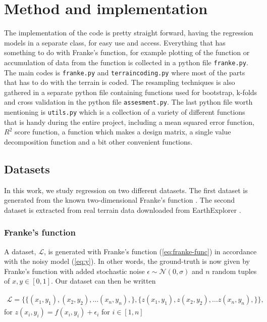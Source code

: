 \documentclass[../main.tex]{subfiles}
\begin{document}
\section{Method and implementation}\label{sec:method}
The implementation of the code is pretty straight forward, having the regression models in a separate class, for easy use and access. Everything that has something to do with Franke's function, for example plotting of the function or accumulation of data from the function is collected in a python file \verb|franke.py|. The main codes is \verb|franke.py| and \verb|terraincoding.py| where most of the parts that has to do with the terrain is coded. The resampling techniques is also gathered in a separate python file containing functions used for bootstrap, k-folds and cross validation in the python file \verb|assesment.py|. The last python file worth mentioning is \verb|utils.py| which is a collection of a variety of different functions that is handy during the entire project, including a mean squared error function, $R^2$ score function, a function which makes a design matrix, a single value decomposition function and a bit other convenient functions.

\subsection{Datasets}
In this work, we study regression on two different datasets. The first dataset is generated from the known two-dimensional Franke's function \cite{FrankeRichard1979}. The second dataset is extracted from real terrain data downloaded from EarthExplorer \cite{EarthExplorer}. 

\subsubsection{Franke's function}
A dataset, \ensuremath{\mathcal{L}}, is generated with Franke's function (\cref{eq:franke-func}) in accordance with the noisy model (\cref{eq:y}). In other words, the ground-truth is now given by Franke's function with added stochastic noise \ensuremath{\epsilon\sim\mathcal{N}(0,\sigma)} and $n$ random tuples of \ensuremath{x,y \in [0,1]}. Our dataset can then be written

\begin{align*}
    \mathcal{L}=\{\{(x_1,y_1), (x_2,y_2), \ldots (x_n,y_n),\},\{z(x_1,y_1),z(x_2,y_2), \ldots z(x_n,y_n),\}\},
\end{align*} for \ensuremath{z(x_i,y_i)=f(x_i,y_i)+\epsilon_i} for \ensuremath{i \in [1, n]}
\end{document}
